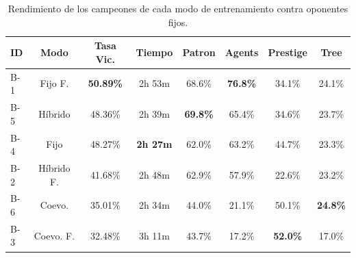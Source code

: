 \begin{table}[H]
	\centering
	\caption{Rendimiento de los campeones de cada modo de entrenamiento contra oponentes fijos.}
	\label{tab:resultados_exp_modos}
    \small
	\begin{tabular}{@{}lccccccc@{}}
		\toprule
		\textbf{ID} & \textbf{Modo} & \textbf{Tasa Vic.} & \textbf{Tiempo} & \textbf{Patron} & \textbf{Agents} & \textbf{Prestige} & \textbf{Tree}   \\
		\midrule
		B-1         & Fijo F.       & \textbf{50.89\%}   & 2h 53m          & 68.6\%          & \textbf{76.8\%} & 34.1\%            & 24.1\%          \\
		B-5         & Híbrido       & 48.36\%            & 2h 39m          & \textbf{69.8\%} & 65.4\%          & 34.6\%            & 23.7\%          \\
		B-4         & Fijo          & 48.27\%            & \textbf{2h 27m} & 62.0\%          & 63.2\%          & 44.7\%            & 23.3\%          \\
		B-2         & Híbrido  F.   & 41.68\%            & 2h 48m          & 62.9\%          & 57.9\%          & 22.6\%            & 23.2\%          \\
		B-6         & Coevo.        & 35.01\%            & 2h 34m          & 44.0\%          & 21.1\%          & 50.1\%            & \textbf{24.8\%} \\
		B-3         & Coevo. F.     & 32.48\%            & 3h 11m          & 43.7\%          & 17.2\%          & \textbf{52.0\%}   & 17.0\%          \\
		\bottomrule
	\end{tabular}
\end{table}


